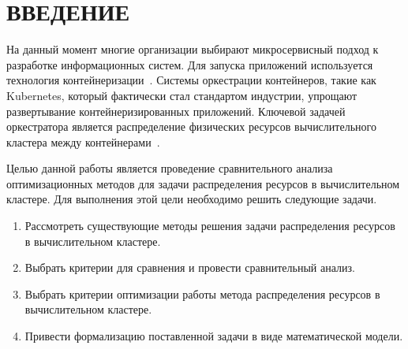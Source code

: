 \chapter*{ВВЕДЕНИЕ}

На данный момент многие организации выбирают микросервисный подход к разработке информационных систем. Для запуска приложений используется технология контейнеризации~\cite{кочер2022микросервисы}. Системы оркестрации контейнеров, такие как Kubernetes, который фактически стал стандартом индустрии, упрощают развертывание контейнеризированных приложений. Ключевой задачей оркестратора является распределение физических ресурсов вычислительного кластера между контейнерами~\cite{carrion2022kubernetes}.

Целью данной работы является проведение сравнительного анализа оптимизационных методов для задачи распределения ресурсов в вычислительном кластере. Для выполнения этой цели необходимо решить следующие задачи.

\begin{enumerate}
	\item Рассмотреть существующие методы решения задачи распределения ресурсов в вычислительном кластере. 
	\item Выбрать критерии для сравнения и провести сравнительный анализ. 
	\item Выбрать критерии оптимизации работы метода распределения ресурсов в вычислительном кластере. 
	\item Привести формализацию поставленной задачи в виде математической модели.
\end{enumerate}